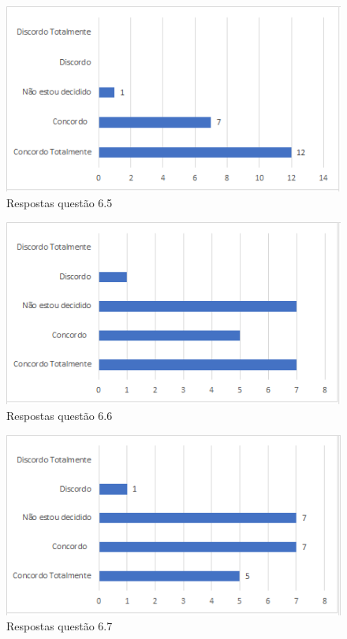 \begin{figure}[!t]
\centering
\includegraphics[scale=0.7]{figuras das questoes/6.5.png}
\caption{Respostas questão 6.5}
\end{figure}

\begin{figure}[!t]
\centering
\includegraphics[scale=0.7]{figuras das questoes/6.6.png}
\caption{Respostas questão 6.6}
\end{figure}

\begin{figure}[!t]
\centering
\includegraphics[scale=0.7]{figuras das questoes/6.7.png}
\caption{Respostas questão 6.7}
\end{figure}

